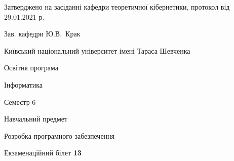 \documentclass[10pt, ukrainian]{article}
\begin{document}
{\vspace{5mm}\smallskip \begin {small} Затверджено на засіданні кафедри теоретичної кібернетики, протокол  від   29.01.2021 р.\par\smallskip\smallskip
{\parbox {6.5 cm}{Зав. кафедри \dotfill Ю.В.~Крак}} \end{small}}
\newpage

{{\begin {small}\par
{ \center  Київський національний університет імені Тараса Шевченка \par}
{\parbox {5 cm}{Освітня програма \hfill}{\parbox {7 cm}{Інформатика \hfill}}\parbox {6 cm}{\hfill Семестр 6}}\par
{\parbox {5 cm} {Навчальний предмет \hfill}\parbox {7 cm}{Розробка програмного забезпечення \hfill}\parbox {6cm}{\hfill}\par}\vspace{-7pt} \end{small}}{\center Екзаменаційний білет \No \textbf
{ 13 }\par}}
\end{document}
